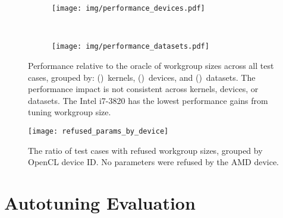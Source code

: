 \begin{figure}
{\begin{minipage}{.48\textwidth}
\begin{subfigure}[h]{.48\columnwidth}
        \centering
        \texttt{[image: img/performance\_devices.pdf]}
        \vspace{-1.5em} %
        \caption{}
        \label{fig:performance-devices}
      \end{subfigure}
      ~%
      \begin{subfigure}[h]{.48\columnwidth}
        \centering
        \texttt{[image: img/performance\_datasets.pdf]}
        \vspace{-1.5em} %
        \caption{}
        \label{fig:performance-datasets}
      \end{subfigure}
      \caption{%
      Performance relative to the oracle of workgroup sizes across all
      test cases, grouped by:
      ()~kernels,
      ()~devices, and
      ()~datasets. The performance
      impact is not consistent across kernels, devices, or datasets. The
      Intel i7-3820 has the lowest performance gains from tuning
      workgroup size.%
      }
      \label{fig:performances}
    \end{minipage}%
    }
  \end{figure}


  \begin{figure}
    \centering
    \vspace{-1em}
    \texttt{[image: refused\_params\_by\_device]}
    \vspace{-1em}
    \caption{%
    The ratio of test cases with refused workgroup sizes, grouped by
    OpenCL device ID. No parameters were refused by the AMD device.
    \vspace{-1em}%
    }
    \label{fig:refused-params}
  \end{figure}


  \section{Autotuning Evaluation}\label{sec:autotuning}

